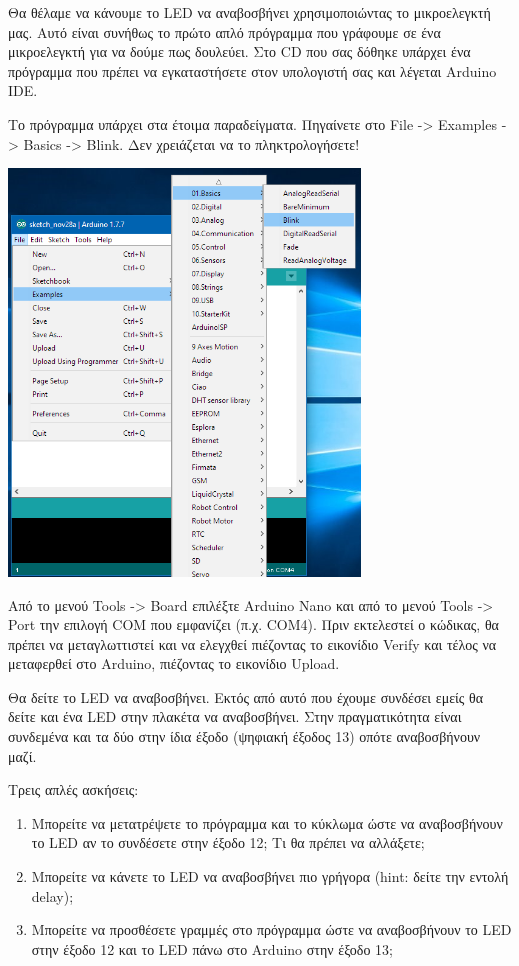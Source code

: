 \documentclass[a4paper,twoside,12pt]{article}
\begin{document}
Θα θέλαμε να κάνουμε το LED να αναβοσβήνει χρησιμοποιώντας το μικροελεγκτή μας. Αυτό είναι συνήθως το πρώτο απλό πρόγραμμα που γράφουμε σε ένα μικροελεγκτή για να δούμε πως δουλεύει. 
Στο CD που σας δόθηκε υπάρχει ένα πρόγραμμα που πρέπει να εγκαταστήσετε στον υπολογιστή σας και λέγεται Arduino IDE.

Το πρόγραμμα υπάρχει στα έτοιμα παραδείγματα. Πηγαίνετε στο File -> Examples -> Basics -> Blink. Δεν χρειάζεται να το πληκτρολογήσετε!

\begin{center}
  \includegraphics[width=0.7\textwidth]{images/main/blink-program}
\end{center}

Από το μενού Tools -> Board επιλέξτε Arduino Nano και από το μενού Tools -> Port την επιλογή COM που εμφανίζει (π.χ. COM4). Πριν εκτελεστεί ο κώδικας, θα πρέπει να μεταγλωττιστεί και να ελεγχθεί πιέζοντας το εικονίδιο Verify και τέλος να μεταφερθεί στο Arduino, πιέζοντας το εικονίδιο Upload.

Θα δείτε το LED να αναβοσβήνει. Εκτός από αυτό που έχουμε συνδέσει εμείς θα δείτε και ένα LED στην πλακέτα να αναβοσβήνει. Στην πραγματικότητα είναι συνδεμένα και τα δύο στην ίδια έξοδο (ψηφιακή έξοδος 13) οπότε αναβοσβήνουν μαζί.

Τρεις απλές ασκήσεις:
\begin{enumerate}
\item Μπορείτε να μετατρέψετε το πρόγραμμα και το κύκλωμα ώστε να αναβοσβήνουν το LED αν το συνδέσετε στην έξοδο 12; Τι θα πρέπει να αλλάξετε; 
\item Μπορείτε να κάνετε το LED να αναβοσβήνει πιο γρήγορα (hint: δείτε την εντολή delay);
\item Μπορείτε να προσθέσετε γραμμές στο πρόγραμμα ώστε να αναβοσβήνουν το LED στην έξοδο 12 και το LED πάνω στο Arduino στην έξοδο 13;
\end{enumerate}
\end{document}
